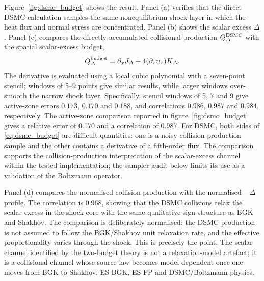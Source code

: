 \documentclass[lineno,paper]{JFM-FLM_Au}
\newenvironment{revision}{\nolinenumbers\begin{tcolorbox}[breakable,colback=revisionyellow,colframe=revisionyellow,boxrule=0pt,arc=0pt,left=5pt,right=5pt,top=5pt,bottom=5pt,before skip=6pt,after skip=6pt]\captionsetup{width=\linewidth}}{\end{tcolorbox}\linenumbers}
\newenvironment{revision}{}{}
\begin{document}
\begin{revision}
Figure~\ref{fig:dsmc_budget} shows the result.  Panel (a) verifies that the direct DSMC calculation samples the same nonequilibrium shock layer in which the heat flux and normal stress are concentrated.  Panel (b) shows the scalar excess $\Delta$.  Panel (c) compares the directly accumulated collisional production $Q_\Delta^{\rm DSMC}$ with the spatial scalar-excess budget,
\begin{equation}
  Q_\Delta^{\rm budget}=\partial_xJ_\Delta+4(\partial_xu_x)K_\Delta .
  \label{eq:dsmc_budget}
\end{equation}
The derivative is evaluated using a local cubic polynomial with a seven-point stencil; windows of 5--9 points give similar results, while larger windows over-smooth the narrow shock layer.  Specifically, stencil windows of 5, 7 and 9 give active-zone errors $0.173$, $0.170$ and $0.188$, and correlations $0.986$, $0.987$ and $0.984$, respectively.  The active-zone comparison reported in figure~\ref{fig:dsmc_budget} gives a relative error of 0.170 and a correlation of 0.987.  For DSMC, both sides of \eqref{eq:dsmc_budget} are difficult quantities: one is a noisy collision-production sample and the other contains a derivative of a fifth-order flux.  The comparison supports the collision-production interpretation of the scalar-excess channel within the tested implementation; the sampler audit below limits its use as a validation of the Boltzmann operator.
\end{revision}

Panel (d) compares the normalised collision production with the normalised $-\Delta$ profile.  The correlation is 0.968, showing that the DSMC collisions relax the scalar excess in the shock core with the same qualitative sign structure as BGK and Shakhov.  The comparison is deliberately normalised: the DSMC production is not assumed to follow the BGK/Shakhov unit relaxation rate, and the effective proportionality varies through the shock.  This is precisely the point.  The scalar channel identified by the two-budget theory is not a relaxation-model artefact; it is a collisional channel whose source law becomes model-dependent once one moves from BGK to Shakhov, ES-BGK, ES-FP and DSMC/Boltzmann physics.
\end{document}
